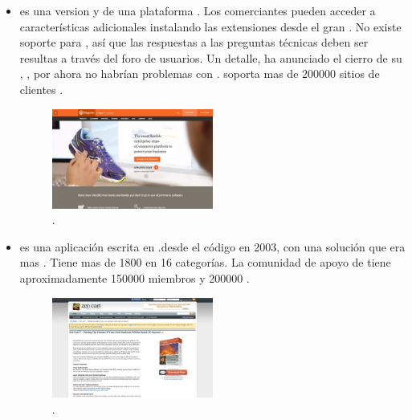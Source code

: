 \begin{itemize}
	\item \textbf{\nameMagento \Community \Edition} es una version \freePC y \openSourcePC de  una plataforma \ecommerce. Los comerciantes pueden acceder a características adicionales instalando las extensiones desde el gran \nameMagento \connectCustom \marketplace. No existe soporte para \nameMagento \Community \Edition, así que las respuestas a las preguntas técnicas deben ser resultas a través del foro de usuarios. Un detalle, \nameMagento ha anunciado el cierro de su \hosted \solution, \nameMagento \go, por ahora no habrían problemas con \Community \Edition. \nameMagento \Community \Edition soporta mas de 200000 sitios de clientes .

	\begin{figure}[H]
		\centering
		\includegraphics[width=0.5\textwidth]{figuras/cap1/MagentoWebsite.jpg}
		\caption{\nameMagento \websiteINT \cite{online_Magento}.}
	\end{figure}


	\item \textbf{\nameZenCart} es una aplicación \ecommerce \openSourcePC escrita en \phpNAME.\nameZenCart \branched desde el código \nameOsCommerce en 2003, con una solución que era mas \templateBased. Tiene mas de 1800 \addOns en 16 categorías. La comunidad de apoyo de \nameZenCart tiene aproximadamente 150000 miembros y 200000 \threadsPL.

	\begin{figure}[H]
		\centering
		\includegraphics[width=0.5\textwidth]{figuras/cap1/ZenCartWebsite.jpg}
		\caption{\nameZenCart \websiteINT \cite{online_ZenCart}.}
	\end{figure}



\end{itemize}
